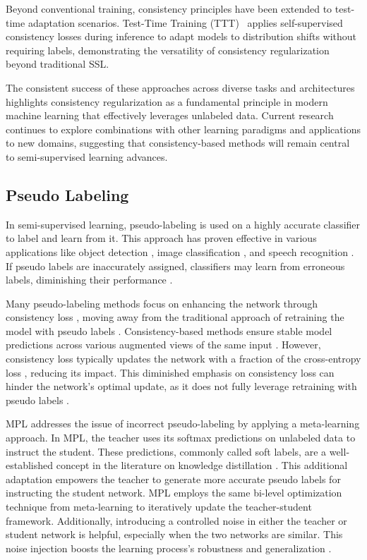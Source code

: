 Beyond conventional training, consistency principles have been extended to test-time adaptation scenarios. Test-Time Training (TTT)~\cite{sun2024learning} applies self-supervised consistency losses during inference to adapt models to distribution shifts without requiring labels, demonstrating the versatility of consistency regularization beyond traditional SSL.

The consistent success of these approaches across diverse tasks and architectures highlights consistency regularization as a fundamental principle in modern machine learning that effectively leverages unlabeled data. Current research continues to explore combinations with other learning paradigms and applications to new domains, suggesting that consistency-based methods will remain central to semi-supervised learning advances.

\subsection{Pseudo Labeling}

In semi-supervised learning, pseudo-labeling is used on a highly accurate classifier to label and learn from it. This approach has proven effective in various applications like object detection \cite{li2022rethinking,yan2019semi}, image classification \cite{taherkhani2021self,wu2017semi}, and speech recognition \cite{lugosch2022pseudo}. If pseudo labels are inaccurately assigned, classifiers may learn from erroneous labels, diminishing their performance \cite{arazo2020pseudo}.

Many pseudo-labeling methods focus on enhancing the network through consistency loss \cite{zhang2021flexmatch}, moving away from the traditional approach of retraining the model with pseudo labels \cite{iscen2019label}. Consistency-based methods ensure stable model predictions across various augmented views of the same input \cite{rizve2021defense}. However, consistency loss typically updates the network with a fraction of the cross-entropy loss \cite{wang2023kd}, reducing its impact. This diminished emphasis on consistency loss can hinder the network's optimal update, as it does not fully leverage retraining with pseudo labels \cite{xie2020unsupervised}.

MPL addresses the issue of incorrect pseudo-labeling by applying a meta-learning \cite{lee2019meta} approach. In MPL, the teacher uses its softmax predictions on unlabeled data to instruct the student. These predictions, commonly called soft labels, are a well-established concept in the literature on knowledge distillation \cite{cho2019efficacy,phuong2019towards}. This additional adaptation empowers the teacher to generate more accurate pseudo labels for instructing the student network. MPL employs the same bi-level optimization technique from meta-learning \cite{snell2017prototypical, nichol2018reptile, finn2017model} to iteratively update the teacher-student framework. Additionally, introducing a controlled noise in either the teacher or student network is helpful, especially when the two networks are similar. This noise injection boosts the learning process's robustness and generalization \cite{wang2023consistent, li2024nicest}.

